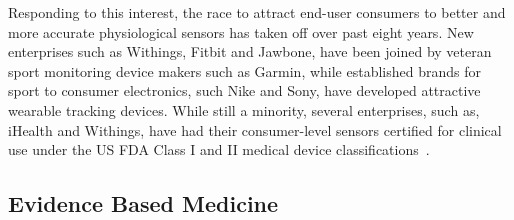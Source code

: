 \documentclass{sigchi}
\begin{document}


Responding to this interest, the race to attract end-user consumers to better and more accurate physiological sensors has taken off over past eight years. New enterprises such as Withings, Fitbit and Jawbone, have been joined by veteran sport monitoring device makers such as Garmin, while established brands for sport to consumer electronics, such Nike and Sony, have developed attractive wearable tracking devices.  While still a minority, several enterprises, such as, iHealth and Withings, have had their consumer-level sensors certified for clinical use under the US FDA Class I and II medical device classifications~\cite{timeline_2013}. 




\subsection{Evidence Based Medicine}%
\end{document}
